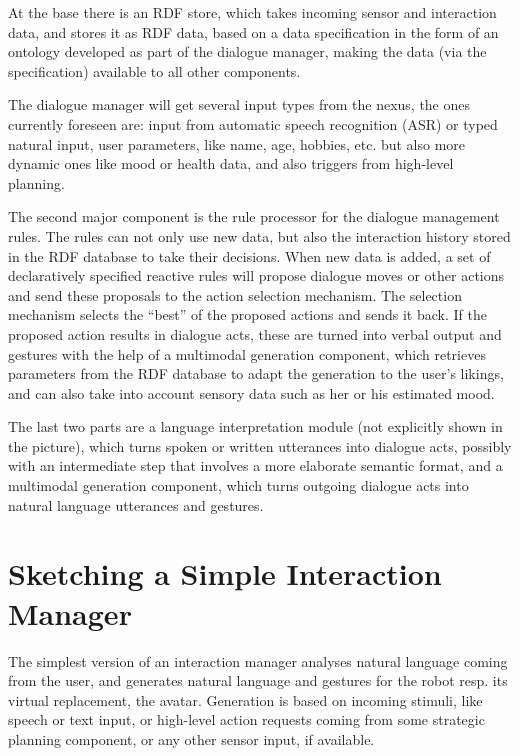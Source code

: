 \documentclass[a4paper]{report}
\begin{document}
At the base there is an RDF store, which takes incoming sensor and interaction
data, and stores it as RDF data, based on a data specification in the form of
an ontology developed as part of the dialogue manager, making the data (via the
specification) available to all other components.

The dialogue manager will get several input types from the nexus, the ones
currently foreseen are: input from automatic speech recognition (ASR) or typed
natural input, user parameters, like name, age, hobbies, etc. but also more
dynamic ones like mood or health data, and also triggers from high-level
planning.

The second major component is the rule processor for the dialogue management
rules. The rules can not only use new data, but also the interaction history
stored in the RDF database to take their decisions.  When new data is added, a
set of declaratively specified reactive rules will propose dialogue moves or
other actions and send these proposals to the action selection mechanism. The
selection mechanism selects the ``best'' of the proposed actions and sends it
back. If the proposed action results in dialogue acts, these are turned into
verbal output and gestures with the help of a multimodal generation component,
which retrieves parameters from the RDF database to adapt the generation to the
user's likings, and can also take into account sensory data such as her or his
estimated mood.

The last two parts are a language interpretation module (not
explicitly shown in the picture), which turns spoken or written utterances
into dialogue acts, possibly with an intermediate step that involves a more
elaborate semantic format, and a multimodal generation component, which turns
outgoing dialogue acts into natural language utterances and gestures.

\chapter{Sketching a Simple Interaction Manager}

The simplest version of an interaction manager analyses natural language
coming from the user, and generates natural language and gestures for the robot
resp. its virtual replacement, the avatar. Generation is based on incoming
stimuli, like speech or text input, or high-level action requests coming from
some strategic planning component, or any other sensor input, if available.
\end{document}
